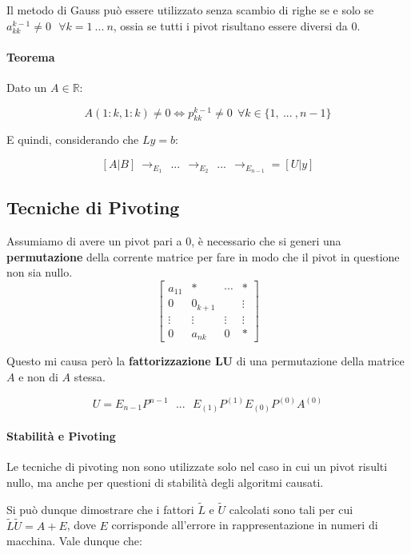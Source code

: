 \documentclass{article}
\begin{document}
\vspace*{10px}

Il metodo di Gauss può essere utilizzato senza scambio di \newline righe se e solo se
$a^{k-1}_{kk} \neq 0 \:\:\: \forall k = 1 \: ... \: n$, ossia se tutti i pivot risultano essere diversi da 0.

\paragraph{Teorema} Dato un $A \in \mathbb{R}$: 

\[ A(1:k,1:k) \neq 0  \Leftrightarrow p^{k-1}_{kk} \neq 0 \:\: \forall k \in \{ 1, \: ... \:, n-1  \} \]

E quindi, considerando che $Ly = b$:

\[ [A|B] \: \rightarrow_{E_{1}} \:\: ... \:\: \rightarrow_{E_{2}} \:\: ... \:\: \rightarrow_{E_{n-1}} = [U|y] \] 

\subsection{Tecniche di Pivoting}

Assumiamo di avere un pivot pari a $0$, è necessario che si generi una \textbf{permutazione}
della corrente matrice per fare in modo che il pivot in questione non sia nullo.
\[
    \begin{bmatrix}
    a_{11} & * & \cdots  & * \\
    0 & 0_{k+1} &  & \vdots\\
     \vdots & \vdots & \vdots &  \vdots\\
     0 & a_{nk} & 0 & *
    \end{bmatrix}
\]

Questo mi causa però la \textbf{fattorizzazione LU} di una permutazione della matrice
$A$ e non di $A$ stessa.

\[ U = E_{n-1}P^{n-1} \:\:\: ... \:\:\: E_{(1)}P^{(1)}E_{(0)}P^{(0)}A^{(0)} \]

\paragraph{Stabilità e Pivoting} Le tecniche di pivoting non sono utilizzate solo
nel caso in cui un pivot risulti nullo, ma anche per questioni di stabilità degli
algoritmi causati.

Si può dunque dimostrare che i fattori $\tilde{L}$ e $\tilde{U}$ calcolati sono tali
per cui $\tilde{L} \tilde{U} = A + E $, dove $E$ corrisponde all'errore in rappresentazione
in numeri di macchina.
Vale dunque che:
\end{document}
